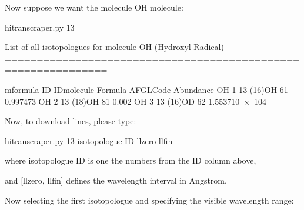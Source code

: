 \documentclass[letterpaper,10pt,english]{sphinxmanual}
\begin{document}
Now suppose we want the molecule OH molecule:

\begin{sphinxVerbatim}[commandchars=\\\{\}]
\PYGZdl{} hitran\PYGZhy{}scraper.py 13

List of all isotopologues for molecule \PYGZsq{}OH\PYGZsq{} (Hydroxyl Radical)
==============================================================

m\PYGZus{}formula      ID    ID\PYGZus{}molecule  Formula      AFGL\PYGZus{}Code  Abundance
\PYGZhy{}\PYGZhy{}\PYGZhy{}\PYGZhy{}\PYGZhy{}\PYGZhy{}\PYGZhy{}\PYGZhy{}\PYGZhy{}\PYGZhy{}\PYGZhy{}  \PYGZhy{}\PYGZhy{}\PYGZhy{}\PYGZhy{}  \PYGZhy{}\PYGZhy{}\PYGZhy{}\PYGZhy{}\PYGZhy{}\PYGZhy{}\PYGZhy{}\PYGZhy{}\PYGZhy{}\PYGZhy{}\PYGZhy{}\PYGZhy{}\PYGZhy{}  \PYGZhy{}\PYGZhy{}\PYGZhy{}\PYGZhy{}\PYGZhy{}\PYGZhy{}\PYGZhy{}\PYGZhy{}\PYGZhy{}  \PYGZhy{}\PYGZhy{}\PYGZhy{}\PYGZhy{}\PYGZhy{}\PYGZhy{}\PYGZhy{}\PYGZhy{}\PYGZhy{}\PYGZhy{}\PYGZhy{}  \PYGZhy{}\PYGZhy{}\PYGZhy{}\PYGZhy{}\PYGZhy{}\PYGZhy{}\PYGZhy{}\PYGZhy{}\PYGZhy{}\PYGZhy{}\PYGZhy{}\PYGZhy{}\PYGZhy{}\PYGZhy{}\PYGZhy{}
OH              1             13  (16)OH              61  0.997473
OH              2             13  (18)OH              81  0.002
OH              3             13  (16)OD              62  1.553710 × 10\PYGZhy{}4


Now, to download lines, please type:

    hitran\PYGZhy{}scraper.py 13 \PYGZlt{}isotopologue ID\PYGZgt{} \PYGZlt{}llzero\PYGZgt{} \PYGZlt{}llfin\PYGZgt{}

where \PYGZlt{}isotopologue ID\PYGZgt{} is one the numbers from the \PYGZsq{}ID\PYGZsq{} column above,

and [\PYGZlt{}llzero\PYGZgt{}, \PYGZlt{}llfin\PYGZgt{}] defines the wavelength interval in Angstrom.
\end{sphinxVerbatim}

Now selecting the first isotopologue and specifying the visible wavelength range:
\end{document}
